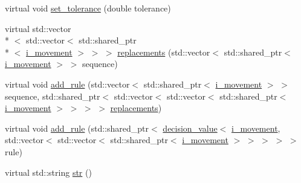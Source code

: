 \begin{DoxyCompactItemize}
\item 
virtual void \hyperlink{classmae_1_1fl_1_1laban_1_1rewriting__forest_a2e1d1eb1d939024e61db33dbbb9d85b0}{set\-\_\-tolerance} (double tolerance)
\item 
virtual std\-::vector\\*
$<$ std\-::vector$<$ std\-::shared\-\_\-ptr\\*
$<$ \hyperlink{classmae_1_1fl_1_1laban_1_1i__movement}{i\-\_\-movement} $>$ $>$ $>$ \hyperlink{classmae_1_1fl_1_1laban_1_1rewriting__forest_a1af307de2c89df6c63738a51ce0f4f54}{replacements} (std\-::vector$<$ std\-::shared\-\_\-ptr$<$ \hyperlink{classmae_1_1fl_1_1laban_1_1i__movement}{i\-\_\-movement} $>$ $>$ sequence)
\item 
virtual void \hyperlink{classmae_1_1fl_1_1laban_1_1rewriting__forest_aa9859191a391f3984ba58c60bc034c65}{add\-\_\-rule} (std\-::vector$<$ std\-::shared\-\_\-ptr$<$ \hyperlink{classmae_1_1fl_1_1laban_1_1i__movement}{i\-\_\-movement} $>$ $>$ sequence, std\-::shared\-\_\-ptr$<$ std\-::vector$<$ std\-::vector$<$ std\-::shared\-\_\-ptr$<$ \hyperlink{classmae_1_1fl_1_1laban_1_1i__movement}{i\-\_\-movement} $>$ $>$ $>$ $>$ \hyperlink{classmae_1_1fl_1_1laban_1_1rewriting__forest_a1af307de2c89df6c63738a51ce0f4f54}{replacements})
\item 
virtual void \hyperlink{classmae_1_1fl_1_1laban_1_1rewriting__forest_a04afb631b9d710c3e591bcca716e353e}{add\-\_\-rule} (std\-::shared\-\_\-ptr$<$ \hyperlink{classmae_1_1fl_1_1laban_1_1decision__value}{decision\-\_\-value}$<$ \hyperlink{classmae_1_1fl_1_1laban_1_1i__movement}{i\-\_\-movement}, std\-::vector$<$ std\-::vector$<$ std\-::shared\-\_\-ptr$<$ \hyperlink{classmae_1_1fl_1_1laban_1_1i__movement}{i\-\_\-movement} $>$ $>$ $>$ $>$ $>$ rule)
\item 
virtual std\-::string \hyperlink{classmae_1_1fl_1_1laban_1_1rewriting__forest_ab096895fc65e8dc3af344228c1ddd70a}{str} ()
\end{DoxyCompactItemize}


